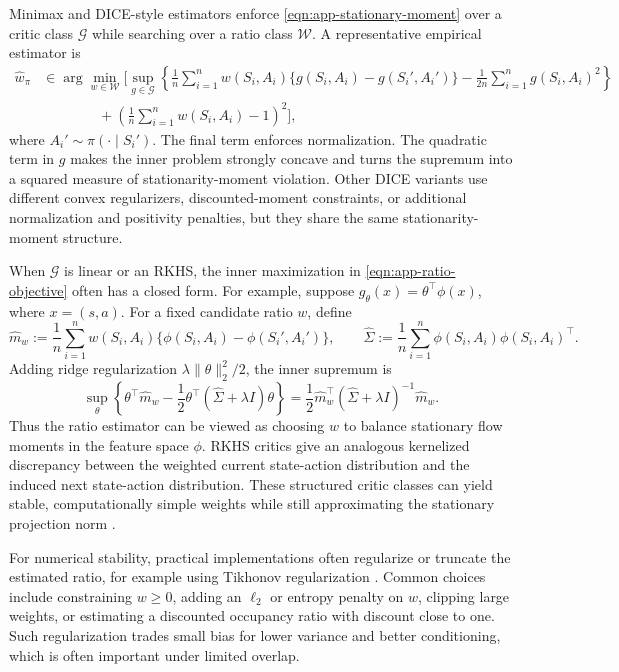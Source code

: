 \documentclass{article}
\theoremstyle{plain}
\theoremstyle{definition}
\theoremstyle{remark}
\begin{document}
Minimax and DICE-style estimators enforce \eqref{eqn:app-stationary-moment}
over a critic class \(\mathcal G\) while searching over a ratio class
\(\mathcal W\). A representative empirical estimator is
\begin{equation}
\label{eqn:app-ratio-objective}
\begin{aligned}
\widehat w_\pi
&\in
\arg\min_{w\in\mathcal W}
\Biggl[
\sup_{g\in\mathcal G}
\left\{
\frac{1}{n}\sum_{i=1}^n
w(S_i,A_i)\{g(S_i,A_i)-g(S_i',A_i')\}
-
\frac{1}{2n}\sum_{i=1}^n g(S_i,A_i)^2
\right\}
\\
&\qquad\qquad+
\left(
\frac{1}{n}\sum_{i=1}^n w(S_i,A_i)-1
\right)^2
\Biggr],
\end{aligned}
\end{equation}
where \(A_i'\sim\pi(\cdot\mid S_i')\). The final term enforces normalization.
The quadratic term in \(g\) makes the inner problem strongly concave and turns
the supremum into a squared measure of stationarity-moment violation. Other
DICE variants use different convex regularizers, discounted-moment constraints,
or additional normalization and positivity penalties, but they share the same
stationarity-moment structure.

When \(\mathcal G\) is linear or an RKHS, the inner maximization in
\eqref{eqn:app-ratio-objective} often has a closed form. For example, suppose
\(g_\theta(x)=\theta^\top\phi(x)\), where \(x=(s,a)\). For a fixed candidate
ratio \(w\), define
\[
\widehat m_w
:=
\frac{1}{n}\sum_{i=1}^n
w(S_i,A_i)\{\phi(S_i,A_i)-\phi(S_i',A_i')\},
\qquad
\widehat\Sigma
:=
\frac{1}{n}\sum_{i=1}^n
\phi(S_i,A_i)\phi(S_i,A_i)^\top .
\]
Adding ridge regularization \(\lambda\|\theta\|_2^2/2\), the inner supremum is
\[
\sup_\theta
\left\{
\theta^\top \widehat m_w
-
\frac{1}{2}\theta^\top(\widehat\Sigma+\lambda I)\theta
\right\}
=
\frac{1}{2}\widehat m_w^\top
(\widehat\Sigma+\lambda I)^{-1}
\widehat m_w .
\]
Thus the ratio estimator can be viewed as choosing \(w\) to balance stationary
flow moments in the feature space \(\phi\). RKHS critics give an analogous
kernelized discrepancy between the weighted current state-action distribution
and the induced next state-action distribution. These structured critic classes
can yield stable, computationally simple weights while still approximating the
stationary projection norm
\citep{dikkala2020minimax,uehara2020minimax,wang2023projected,
olivas2025source}.

For numerical stability, practical implementations often regularize or truncate
the estimated ratio, for example using Tikhonov regularization
\citep{uehara2021finite}. Common choices include constraining \(w\ge 0\), adding
an \(\ell_2\) or entropy penalty on \(w\), clipping large weights, or estimating
a discounted occupancy ratio with discount close to one. Such regularization
trades small bias for lower variance and better conditioning, which is often
important under limited overlap.
 
\end{document}
